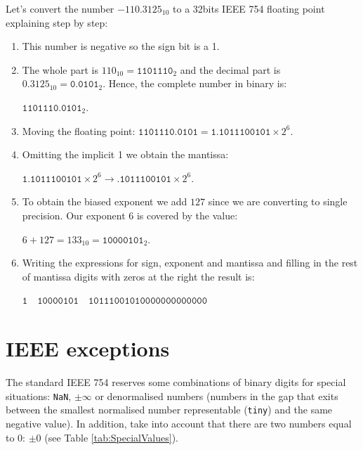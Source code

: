 Let's convert the number $-110.3125_{10}$ to a 32bits IEEE 754 floating point explaining step by step:

\begin{enumerate}
    \item This number is negative so the sign bit is a 1.
    
    \item The whole part is $110_{10}=\texttt{1101110}_2$ and the decimal part is $0.3125_{10}=\texttt{0.0101}_2$. Hence, the complete number in binary is:
    
     $\texttt{1101110.0101}_2$. 
    
    \item Moving the floating point: $\texttt{1101110.0101}=\texttt{1.1011100101} \times 2^6$.
    
    \item Omitting the implicit 1 we obtain the mantissa: 
    
    $\texttt{1.1011100101}\times2^6 \rightarrow \texttt{.1011100101}\times2^6$.
    
    \item To obtain the biased exponent we add $127$ since we are converting to single precision. Our exponent $6$ is covered by the value:
    
     $6 + 127 = 133_{10}= \texttt{10000101}_2$. 
    
    \item Writing the expressions for sign, exponent and mantissa and filling in the rest of mantissa digits with zeros at the right the result is: 
    
    $\texttt{1}\quad \texttt{10000101}\quad \texttt{10111001010000000000000}$
    
\end{enumerate}






    \FloatBarrier    
    \section{IEEE exceptions} \label{sec:exceptions}

The standard IEEE 754 reserves some combinations of binary digits for special situations: \texttt{NaN}, $\pm\infty$ or denormalised numbers (numbers in the gap that exits between the smallest normalised number representable (\texttt{tiny}) and the same negative value). In addition, take into account that there are two numbers equal to $0$: $\pm 0$ (see Table \ref{tab:SpecialValues}).

